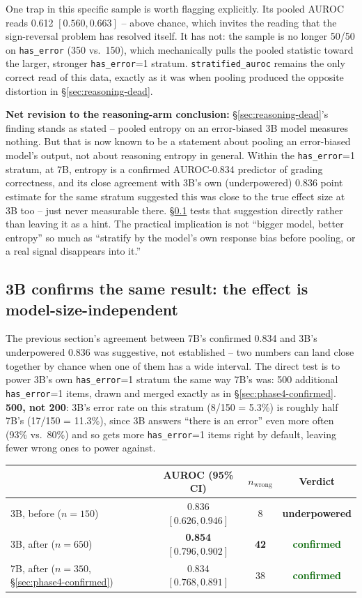 \documentclass[11pt]{article}
\newcommand{\worked}[1]{\textcolor{darkgreen}{\textbf{#1}}}
\newcommand{\unresolved}[1]{\textcolor{darkamber}{\textbf{#1}}}
\begin{document}
One trap in this specific sample is worth flagging explicitly. Its pooled
AUROC reads 0.612 $[0.560, 0.663]$ -- above chance, which invites the reading
that the sign-reversal problem has resolved itself. It has not: the sample is
no longer 50/50 on \texttt{has\_error} (350 vs.\ 150), which mechanically
pulls the pooled statistic toward the larger, stronger \texttt{has\_error}=1
stratum. \texttt{stratified\_auroc} remains the only correct read of this
data, exactly as it was when pooling produced the opposite distortion in
\S\ref{sec:reasoning-dead}.

\textbf{Net revision to the reasoning-arm conclusion:} \S\ref{sec:reasoning-dead}'s
finding stands as stated -- pooled entropy on an error-biased 3B model
measures nothing. But that is now known to be a statement about pooling an
error-biased model's output, not about reasoning entropy in general. Within
the \texttt{has\_error}=1 stratum, at 7B, entropy is a confirmed AUROC-0.834
predictor of grading correctness, and its close agreement with 3B's own
(underpowered) 0.836 point estimate for the same stratum suggested this was
close to the true effect size at 3B too -- just never measurable there.
\S\ref{sec:phase4-3b} tests that suggestion directly rather than leaving it
as a hint. The practical implication is not ``bigger model, better entropy''
so much as ``stratify by the model's own response bias before pooling, or a
real signal disappears into it.''

\subsection{3B confirms the same result: the effect is model-size-independent}
\label{sec:phase4-3b}

The previous section's agreement between 7B's confirmed 0.834 and 3B's
underpowered 0.836 was suggestive, not established -- two numbers can land
close together by chance when one of them has a wide interval. The direct
test is to power 3B's own \texttt{has\_error}=1 stratum the same way 7B's
was: 500 additional \texttt{has\_error}=1 items, drawn and merged exactly as
in \S\ref{sec:phase4-confirmed}. \textbf{500, not 200}: 3B's error rate on this
stratum (8/150 = 5.3\%) is roughly half 7B's (17/150 = 11.3\%), since 3B
answers ``there is an error'' even more often (93\% vs.\ 80\%) and so gets
more \texttt{has\_error}=1 items right by default, leaving fewer wrong ones
to power against.

\begin{center}
\begin{tabular}{lccc}
\toprule
& AUROC (95\% CI) & $n_{\text{wrong}}$ & Verdict \\
\midrule
3B, before ($n=150$) & 0.836 $[0.626, 0.946]$ & 8 & \unresolved{underpowered} \\
3B, after ($n=650$) & \textbf{0.854} $[0.796, 0.902]$ & \textbf{42} & \worked{confirmed} \\
7B, after ($n=350$, \S\ref{sec:phase4-confirmed}) & 0.834 $[0.768, 0.891]$ & 38 & \worked{confirmed} \\
\bottomrule
\end{tabular}
\end{center}
\end{document}
